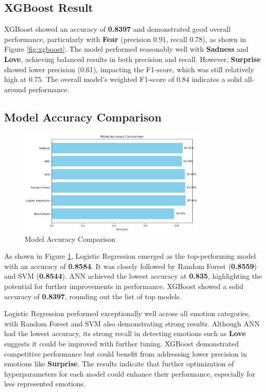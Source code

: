 \subsection{XGBoost Result}
XGBoost showed an accuracy of \textbf{0.8397} and demonstrated good overall performance, particularly with \textbf{Fear} (precision 0.91, recall 0.78), as shown in Figure \ref{fig:xgboost}. The model performed reasonably well with \textbf{Sadness} and \textbf{Love}, achieving balanced results in both precision and recall. However, \textbf{Surprise} showed lower precision (0.61), impacting the F1-score, which was still relatively high at 0.75. The overall model's weighted F1-score of 0.84 indicates a solid all-around performance.

\subsection{Model Accuracy Comparison}
\begin{figure}[h!]
\centering
\includegraphics[width=0.8\textwidth]{model_accuracy.png}
\caption{Model Accuracy Comparison}
\label{fig:model_accuracy}
\end{figure}
As shown in Figure \ref{fig:model_accuracy}, Logistic Regression emerged as the top-performing model with an accuracy of \textbf{0.8584}. It was closely followed by Random Forest (\textbf{0.8559}) and SVM (\textbf{0.8544}). ANN achieved the lowest accuracy at \textbf{0.835}, highlighting the potential for further improvements in performance. XGBoost showed a solid accuracy of \textbf{0.8397}, rounding out the list of top models.

Logistic Regression performed exceptionally well across all emotion categories, with Random Forest and SVM also demonstrating strong results. Although ANN had the lowest accuracy, its strong recall in detecting emotions such as \textbf{Love} suggests it could be improved with further tuning. XGBoost demonstrated competitive performance but could benefit from addressing lower precision in emotions like \textbf{Surprise}. The results indicate that further optimization of hyperparameters for each model could enhance their performance, especially for less represented emotions.
